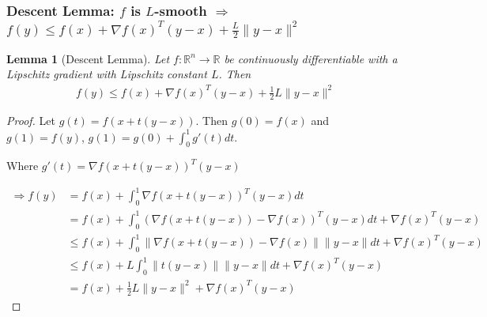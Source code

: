 \documentclass[11pt,a4paper]{article}
\newtheorem{lemma}{Lemma}
\begin{document}
\subsubsection{Descent Lemma: $f$ is $L$-smooth $\Rightarrow$ $f(y)\leq f(x)+\nabla f(x)^T(y-x)+\frac{L}{2}\|y-x\|^2$}
\begin{lemma}[Descent Lemma]
Let $f: \mathbb{R}^n \rightarrow \mathbb{R}$ be continuously differentiable with a Lipschitz gradient with Lipschitz constant $L$. Then
\begin{equation}
    \begin{aligned}
        f(y)\leq f(x)+\nabla f(x)^T(y-x)+\frac{1}{2}L\|y-x\|^2
    \end{aligned}
    \nonumber
\end{equation}
\end{lemma}
\begin{proof}
Let $g(t)=f(x+t(y-x))$. Then $g(0)=f(x)$ and $g(1)=f(y)$, $g(1)=g(0)+\int_0^1g'(t)dt$.

Where $g'(t)=\nabla f(x+t(y-x))^T(y-x)$

\begin{equation}
    \begin{aligned}
        \Rightarrow	f(y)&=f(x)+\int_0^1\nabla f(x+t(y-x))^T(y-x)dt\\
        &=f(x)+\int_0^1(\nabla f(x+t(y-x))-\nabla f(x))^T(y-x)dt+\nabla f(x)^T(y-x)\\
        &\leq f(x)+\int_0^1\|\nabla f(x+t(y-x))-\nabla f(x)\|\|y-x\|dt+\nabla f(x)^T(y-x)\\
        &\leq f(x)+L\int_0^1\|t(y-x)\|\|y-x\|dt+\nabla f(x)^T(y-x)\\
        &=f(x)+\frac{1}{2}L\|y-x\|^2+\nabla f(x)^T(y-x)
    \end{aligned}
    \nonumber
\end{equation}
\end{proof}
\end{document}
